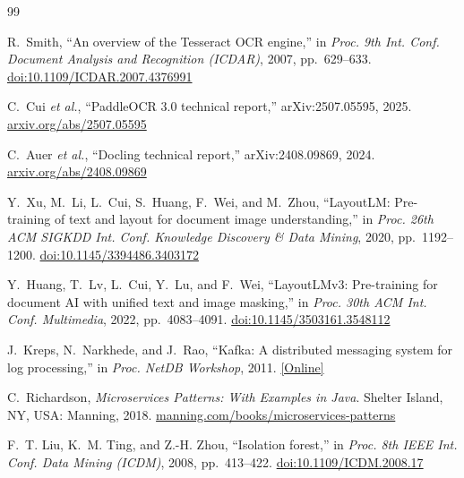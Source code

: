 \begin{thebibliography}{99}

R.~Smith, ``An overview of the Tesseract OCR engine,'' in \emph{Proc. 9th Int. Conf. Document Analysis and Recognition (ICDAR)}, 2007, pp.~629--633. \href{https://doi.org/10.1109/ICDAR.2007.4376991}{doi:10.1109/ICDAR.2007.4376991}

C.~Cui \emph{et al.}, ``PaddleOCR 3.0 technical report,'' arXiv:2507.05595, 2025. \href{https://arxiv.org/abs/2507.05595}{arxiv.org/abs/2507.05595}

C.~Auer \emph{et al.}, ``Docling technical report,'' arXiv:2408.09869, 2024. \href{https://arxiv.org/abs/2408.09869}{arxiv.org/abs/2408.09869}

Y.~Xu, M.~Li, L.~Cui, S.~Huang, F.~Wei, and M.~Zhou, ``LayoutLM: Pre-training of text and layout for document image understanding,'' in \emph{Proc. 26th ACM SIGKDD Int. Conf. Knowledge Discovery \& Data Mining}, 2020, pp.~1192--1200. \href{https://doi.org/10.1145/3394486.3403172}{doi:10.1145/3394486.3403172}

Y.~Huang, T.~Lv, L.~Cui, Y.~Lu, and F.~Wei, ``LayoutLMv3: Pre-training for document AI with unified text and image masking,'' in \emph{Proc. 30th ACM Int. Conf. Multimedia}, 2022, pp.~4083--4091. \href{https://doi.org/10.1145/3503161.3548112}{doi:10.1145/3503161.3548112}

J.~Kreps, N.~Narkhede, and J.~Rao, ``Kafka: A distributed messaging system for log processing,'' in \emph{Proc. NetDB Workshop}, 2011. \href{https://www.microsoft.com/en-us/research/wp-content/uploads/2017/09/Kafka.pdf}{[Online]}

C.~Richardson, \emph{Microservices Patterns: With Examples in Java}. Shelter Island, NY, USA: Manning, 2018. \href{https://www.manning.com/books/microservices-patterns}{manning.com/books/microservices-patterns}

F.~T. Liu, K.~M. Ting, and Z.-H. Zhou, ``Isolation forest,'' in \emph{Proc. 8th IEEE Int. Conf. Data Mining (ICDM)}, 2008, pp.~413--422. \href{https://doi.org/10.1109/ICDM.2008.17}{doi:10.1109/ICDM.2008.17}


\end{thebibliography}
